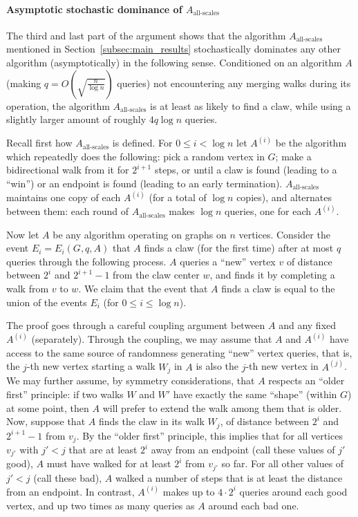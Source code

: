 \documentclass[11pt]{article}
\numberwithin{equation}{section}
\newcommand{\1}{\mathbf{1}}
\begin{document}
\paragraph{Asymptotic stochastic dominance of $A_{\text{all-scales}}$}
The third and last part of the argument shows that the algorithm $A_{\text{all-scales}}$ mentioned in Section~\ref{subsec:main_results} stochastically dominates any other algorithm (asymptotically) in the following sense. Conditioned on an algorithm $A$ (making $q = O\left(\sqrt{\frac{n}{\log n}}\right)$ queries) not encountering any merging walks during its operation, the algorithm $A_{\text{all-scales}}$ is at least as likely to find a claw, while using a slightly larger amount of roughly $4q \log n$ queries. 

Recall first how $A_{\text{all-scales}}$ is defined. For $0 \leq i < \log n$ let $A^{(i)}$ be the algorithm which repeatedly does the following: pick a random vertex in $G$; make a bidirectional walk from it for $2^{i+1}$ steps, or until a claw is found (leading to a ``win'') or an endpoint is found (leading to an early termination). 
$A_{\text{all-scales}}$ maintains one copy of each $A^{(i)}$ (for a total of $\log n$ copies), and alternates between them: each round of $A_{\text{all-scales}}$ makes $\log n$ queries, one for each $A^{(i)}$.

Now let $A$ be any algorithm operating on graphs on $n$ vertices.
Consider the event $E_i = E_i(G, q, A)$ that $A$ finds a claw (for the first time) after at most $q$ queries through the following process. $A$ queries a ``new'' vertex $v$ of distance between $2^{i}$ and $2^{i+1}-1$ from the claw center $w$, and finds it by completing a walk from $v$ to $w$. 
We claim that the event that $A$ finds a claw is equal to the union of the events $E_i$ (for $0 \leq i \leq \log n$).


The proof goes through a careful coupling argument between $A$ and any fixed $A^{(i)}$ (separately). Through the coupling, we may assume that $A$ and $A^{(i)}$ have access to the same source of randomness generating ``new'' vertex queries, that is, the $j$-th new vertex starting a walk $W_j$ in $A$ is also the $j$-th new vertex in $A^{(j)}$. We may further assume, by symmetry considerations, that $A$ respects an ``older first'' principle: if two walks $W$ and $W'$ have exactly the same ``shape'' (within $G$) at some point, then $A$ will prefer to extend the walk among them that is older. Now, suppose that $A$ finds the claw in its walk $W_j$, of distance between $2^i$ and $2^{i+1}-1$ from $v_j$. By the ``older first'' principle, this implies that for all vertices $v_{j'}$ with $j' < j$ that are at least $2^i$ away from an endpoint (call these values of $j'$ good), $A$ must have walked for at least $2^i$ from $v_{j'}$ so far. For all other values of $j' < j$ (call these bad), $A$ walked a number of steps that is at least the distance from an endpoint.
In contrast, $A^{(i)}$ makes up to $4 \cdot 2^{i}$ queries around each good vertex, and up two times as many queries as $A$ around each bad one. 
\end{document}
